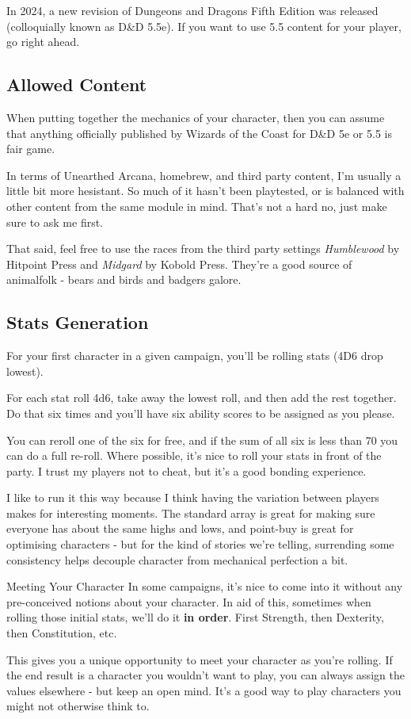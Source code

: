 In 2024, a new revision of Dungeons and Dragons Fifth Edition was released (colloquially known as D\&D 5.5e). If you want to use 5.5 content for your player, go right ahead.

\subsection {Allowed Content}

When putting together the mechanics of your character, then you can assume that anything officially published by Wizards of the Coast for D\&D 5e or 5.5 is fair game.

In terms of Unearthed Arcana, homebrew, and third party content, I'm usually a little bit more hesistant. So much of it hasn't been playtested, or is balanced with other content from the same module in mind. That's not a hard no, just make sure to ask me first.

That said, feel free to use the races from the third party settings \textit {Humblewood} by Hitpoint Press and \textit{Midgard} by Kobold Press. They're a good source of animalfolk - bears and birds and badgers galore.

\subsection {Stats Generation}

For your first character in a given campaign, you'll be rolling stats (4D6 drop lowest). 

For each stat roll 4d6, take away the lowest roll, and then add the rest together. Do that six times and you'll have six ability scores to be assigned as you please.

You can reroll one of the six for free, and if the sum of all six is less than 70 you can do a full re-roll. Where possible, it's nice to roll your stats in front of the party. I trust my players not to cheat, but it's a good bonding experience.

I like to run it this way because I think having the variation between players makes for interesting moments. The standard array is great for making sure everyone has about the same highs and lows, and point-buy is great for optimising characters - but for the kind of stories we're telling, surrending some consistency helps decouple character from mechanical perfection a bit.

\begin{DndComment}{Meeting Your Character}
In some campaigns, it's nice to come into it without any pre-conceived notions about your character. In aid of this, sometimes when rolling those initial stats, we'll do it \textbf{in order}. First Strength, then Dexterity, then Constitution, etc.

This gives you a unique opportunity to meet your character as you're rolling. If the end result is a character you wouldn't want to play, you can always assign the values elsewhere - but keep an open mind. It's a good way to play characters you might not otherwise think to.
\end{DndComment}

